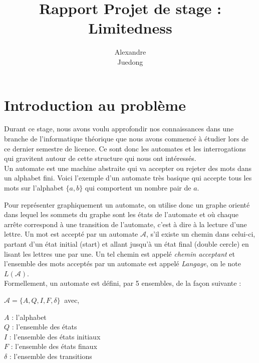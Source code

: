 \documentclass{report}
\title{\textbf{Rapport Projet de stage : Limitedness}}
\author{
\bsc {Brebant} Alexandre\\
\bsc {Xue} Juedong}
\begin{document}
\maketitle

\newcommand{\Aut}{\mathcal{A}}
\newcommand{\Ref}{\Aut_{ref}}
\newcommand{\N}{\mathbb{N}}
\newcommand{\R}{\mathcal{R}}

\tableofcontents
\chapter{Introduction au problème}
Durant ce stage, nous avons voulu approfondir nos connaissances dans une branche de l'informatique théorique que nous avons commencé à étudier lors de ce dernier semestre de licence. Ce sont donc les automates et les interrogations qui gravitent autour de cette structure qui nous ont intéressés.\\
Un automate est une machine abstraite qui va accepter ou rejeter des mots dans un alphabet fini. 
Voici l'exemple d'un automate très basique qui accepte tous les mots sur l'alphabet $\{a, b\}$ qui comportent un nombre pair de $a$.
\begin{center}
\end{center}

Pour représenter graphiquement un automate, on utilise donc un graphe orienté dans lequel les sommets du graphe sont les états de l'automate et où chaque arrête correspond à une transition de l'automate, c'est à dire à la lecture d'une lettre. Un mot est accepté par un automate $\Aut$, s'il existe un chemin dans celui-ci, partant d'un état initial (start) et allant jusqu'à un état final (double cercle) en lisant les lettres une par une. Un tel chemin est appelé \textit{chemin acceptant} et l'ensemble des mots acceptés par un automate est appelé \textit{Langage}, on le note $L(\Aut)$.\\ 
Formellement, un automate est défini, par 5 ensembles, de la façon suivante :
\begin{center}
 $ \Aut = \{ A, Q, I, F, \delta \}\ $     avec,
 \end{center}
$A$ : l’alphabet\\
$Q$ : l'ensemble des états\\
$I$ : l'ensemble des états initiaux\\
$F$ : l'ensemble des états finaux\\
$\delta$ : l'ensemble des transitions\\
\end{document}
